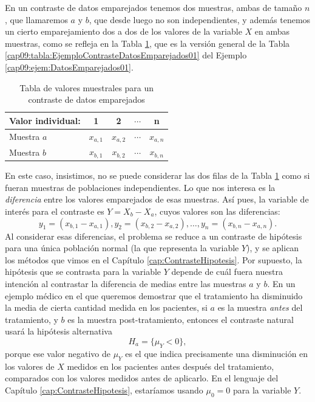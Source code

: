 En un contraste de datos emparejados tenemos dos muestras, ambas de tamaño $n$, que llamaremos $a$ y $b$, que desde luego no son independientes, y además tenemos un cierto emparejamiento dos a dos de los valores de la variable $X$ en ambas muestras, como se refleja en la Tabla \ref{cap09:tabla:ContrasteDatosEmparejados}, que es la versión general de la Tabla \ref{cap09:tabla:EjemploContrasteDatosEmparejados01} del Ejemplo \ref{cap09:ejem:DatosEmparejados01}.

\begin{table}[htb]
    \begin{center}
    \begin{tabular}{|l|c|c|c|c|}
    \hline
    Valor individual:&1&2&$\cdots$ &n\\
    \hline
    Muestra $a$&$x_{a, 1}$&$x_{a, 2}$&$\cdots$&$x_{a, n}$\\
    \hline
    Muestra $b$&$x_{b, 1}$&$x_{b, 2}$&$\cdots$&$x_{b, n}$\\
    \hline
    \end{tabular}
    \end{center}
\caption{Tabla de valores muestrales para un contraste de datos emparejados}
\label{cap09:tabla:ContrasteDatosEmparejados}
\end{table}

En este caso, insistimos, no se puede considerar las dos filas de la Tabla
\ref{cap09:tabla:ContrasteDatosEmparejados} como si fueran muestras de poblaciones independientes.
Lo que nos interesa es la {\em diferencia} entre los valores emparejados de esas muestras. Así
pues, la variable de interés para el contraste es $Y=X_b-X_a$, cuyos valores son las diferencias:
\[
y_1=(x_{b, 1}-x_{a, 1}), y_2=(x_{b, 2}-x_{a, 2}), \ldots, y_n=(x_{b, n}-x_{a, n}).
\]
Al considerar esas diferencias, el problema se reduce a un contraste de hipótesis para una única
población normal (la que representa la variable $Y$), y se aplican los métodos que vimos en el
Capítulo \ref{cap:ContrasteHipotesis}. Por supuesto, la hipótesis que se contrasta para la variable
$Y$ depende de cuál fuera nuestra intención al contrastar la diferencia de medias entre las
muestras $a$ y $b$.  En un ejemplo médico en el que queremos demostrar que el tratamiento ha
disminuido la media de cierta cantidad medida en los pacientes, si $a$ es la muestra {\em antes}
del tratamiento, y $b$ es la muestra post-tratamiento, entonces el contraste natural usará la
hipótesis alternativa
\[H_a=\{\mu_Y < 0\},\]
porque ese valor negativo de $\mu_Y$ es el que indica precisamente una disminución en los valores de $X$ medidos en los pacientes antes después del tratamiento, comparados con los valores medidos antes de aplicarlo.  En el lenguaje del Capítulo \ref{cap:ContrasteHipotesis}, estaríamos usando $\mu_0=0$ para la variable $Y$.

